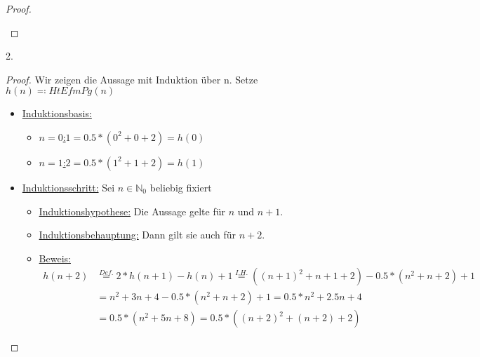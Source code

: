 \documentclass[hidelinks]{article}
\theoremstyle{plain}
\theoremstyle{definition}
\theoremstyle{rem}
\begin{document}
\begin{sloppypar}
\begin{proof}
\begin{itemize}
\begin{itemize}
	\end{itemize}
\end{itemize}
\hfill
\end{proof}
2. \begin{proof}
Wir zeigen die Aussage mit Induktion über n. Setze $h(n)\eqqcolon HtEfmPg(n)$
\begin{itemize}
\item \underline{Induktionsbasis:} 
\begin{itemize}
\item \underline{$n=0$:}\qquad$1=0.5*(0^2+0+2)=h(0)$
\item \underline{$n=1$:}\qquad$2=0.5*(1^2+1+2)=h(1)$
\end{itemize}
\item \underline{Induktionsschritt:} Sei $n\in \mathbb{N}_0$ beliebig fixiert
	\begin{itemize}
	\item \underline{Induktionshypothese:} Die Aussage gelte für $n$ und $n+1$.
	\item \underline{Induktionsbehauptung:} Dann gilt sie auch für $n+2$.
	\item \underline{Beweis:}
	\begin{align*}
		h(n+2)&\stackrel{Def.}{=}2*h(n+1)-h(n)+1\stackrel{I.H.}{=}((n+1)^2+n+1+2)-0.5*(n^2+n+2)+1\\
		&=n^2+3n+4-0.5*(n^2+n+2)+1=0.5*n^2+2.5n+4\\
		&=0.5*(n^2+5n+8)=0.5*((n+2)^2+(n+2)+2)
	\end{align*}
	\end{itemize}
\end{itemize}
\end{proof}

\end{sloppypar}
\end{document}
